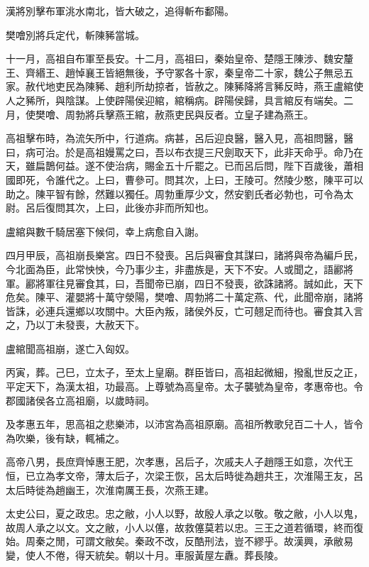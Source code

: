 漢將別擊布軍洮水南北，皆大破之，追得斬布鄱陽。

樊噲別將兵定代，斬陳豨當城。

十一月，高祖自布軍至長安。十二月，高祖曰，秦始皇帝、楚隱王陳涉、魏安釐王、齊緡王、趙悼襄王皆絕無後，予守冢各十家，秦皇帝二十家，魏公子無忌五家。赦代地吏民為陳豨、趙利所劫掠者，皆赦之。陳豨降將言豨反時，燕王盧綰使人之豨所，與陰謀。上使辟陽侯迎綰，綰稱病。辟陽侯歸，具言綰反有端矣。二月，使樊噲、周勃將兵擊燕王綰，赦燕吏民與反者。立皇子建為燕王。

高祖擊布時，為流矢所中，行道病。病甚，呂后迎良醫，醫入見，高祖問醫，醫曰，病可治。於是高祖嫚罵之曰，吾以布衣提三尺劍取天下，此非天命乎。命乃在天，雖扁鵲何益。遂不使治病，賜金五十斤罷之。已而呂后問，陛下百歲後，蕭相國即死，令誰代之。上曰，曹參可。問其次，上曰，王陵可。然陵少憨，陳平可以助之。陳平智有餘，然難以獨任。周勃重厚少文，然安劉氏者必勃也，可令為太尉。呂后復問其次，上曰，此後亦非而所知也。

盧綰與數千騎居塞下候伺，幸上病愈自入謝。

四月甲辰，高祖崩長樂宮。四日不發喪。呂后與審食其謀曰，諸將與帝為編戶民，今北面為臣，此常怏怏，今乃事少主，非盡族是，天下不安。人或聞之，語酈將軍。酈將軍往見審食其，曰，吾聞帝已崩，四日不發喪，欲誅諸將。誠如此，天下危矣。陳平、灌嬰將十萬守滎陽，樊噲、周勃將二十萬定燕、代，此聞帝崩，諸將皆誅，必連兵還鄉以攻關中。大臣內叛，諸侯外反，亡可翹足而待也。審食其入言之，乃以丁未發喪，大赦天下。

盧綰聞高祖崩，遂亡入匈奴。

丙寅，葬。己巳，立太子，至太上皇廟。群臣皆曰，高祖起微細，撥亂世反之正，平定天下，為漢太祖，功最高。上尊號為高皇帝。太子襲號為皇帝，孝惠帝也。令郡國諸侯各立高祖廟，以歲時祠。

及孝惠五年，思高祖之悲樂沛，以沛宮為高祖原廟。高祖所教歌兒百二十人，皆令為吹樂，後有缺，輒補之。

高帝八男，長庶齊悼惠王肥，次孝惠，呂后子，次戚夫人子趙隱王如意，次代王恒，已立為孝文帝，薄太后子，次梁王恢，呂太后時徙為趙共王，次淮陽王友，呂太后時徙為趙幽王，次淮南厲王長，次燕王建。

太史公曰，夏之政忠。忠之敝，小人以野，故殷人承之以敬。敬之敝，小人以鬼，故周人承之以文。文之敝，小人以僿，故救僿莫若以忠。三王之道若循環，終而復始。周秦之閒，可謂文敝矣。秦政不改，反酷刑法，豈不繆乎。故漢興，承敝易變，使人不倦，得天統矣。朝以十月。車服黃屋左纛。葬長陵。